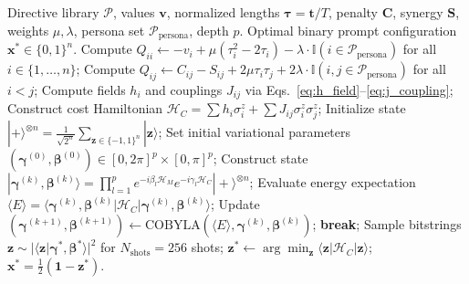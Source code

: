 \documentclass[review,12pt,times,authoryear]{elsarticle}
\theoremstyle{definition}
\begin{document}
\begin{algorithm}[t]
\caption{Offline Prompt Optimization via QAOA / Ising Eigensolver}
\label{alg:qaoa_compilation}
\begin{algorithmic}[1]
\Require Directive library $\mathcal{P}$, values $\bm{v}$, normalized lengths $\bm{\tau} = \bm{t}/T$, penalty $\mathbf{C}$, synergy $\mathbf{S}$, weights $\mu, \lambda$, persona set $\mathcal{P}_{\mathrm{persona}}$, depth $p$.
\Ensure Optimal binary prompt configuration $\bm{x}^* \in \{0, 1\}^n$.
\State Compute $Q_{ii} \leftarrow -v_i + \mu(\tau_i^2 - 2\tau_i) - \lambda \cdot \mathbb{I}(i \in \mathcal{P}_{\mathrm{persona}})$ for all $i \in \{1, \ldots, n\}$;
\State Compute $Q_{ij} \leftarrow C_{ij} - S_{ij} + 2\mu \tau_i \tau_j + 2\lambda \cdot \mathbb{I}(i, j \in \mathcal{P}_{\mathrm{persona}})$ for all $i < j$;
\State Compute fields $h_i$ and couplings $J_{ij}$ via Eqs.~\eqref{eq:h_field}--\eqref{eq:j_coupling};
\State Construct cost Hamiltonian $\mathcal{H}_C = \sum h_i \sigma_i^z + \sum J_{ij}\sigma_i^z\sigma_j^z$;
\State Initialize state $|+\rangle^{\otimes n} = \frac{1}{\sqrt{2^n}}\sum_{\bm{z} \in \{-1, 1\}^n} |\bm{z}\rangle$;
\State Set initial variational parameters $(\bm{\gamma}^{(0)}, \bm{\beta}^{(0)}) \in [0, 2\pi]^p \times [0, \pi]^p$;
  \State Construct state $|\bm{\gamma}^{(k)}, \bm{\beta}^{(k)}\rangle = \prod_{l=1}^p e^{-i \beta_l \mathcal{H}_M} e^{-i \gamma_l \mathcal{H}_C} |+\rangle^{\otimes n}$;
  \State Evaluate energy expectation $\langle E \rangle = \langle \bm{\gamma}^{(k)}, \bm{\beta}^{(k)} | \mathcal{H}_C | \bm{\gamma}^{(k)}, \bm{\beta}^{(k)} \rangle$;
  \State Update $(\bm{\gamma}^{(k+1)}, \bm{\beta}^{(k+1)}) \leftarrow \mathrm{COBYLA}(\langle E \rangle, \bm{\gamma}^{(k)}, \bm{\beta}^{(k)})$;
    \State \textbf{break};
  \EndIf
\EndFor
\State Sample bitstrings $\bm{z} \sim |\langle \bm{z} | \bm{\gamma}^*, \bm{\beta}^* \rangle|^2$ for $N_{\mathrm{shots}} = 256$ shots;
\State $\bm{z}^* \leftarrow \arg\min_{\bm{z}} \langle \bm{z} | \mathcal{H}_C | \bm{z} \rangle$;
\State \Return $\bm{x}^* = \frac{1}{2}(\mathbf{1} - \bm{z}^*)$.
\end{algorithmic}
\end{algorithm}
\end{document}
